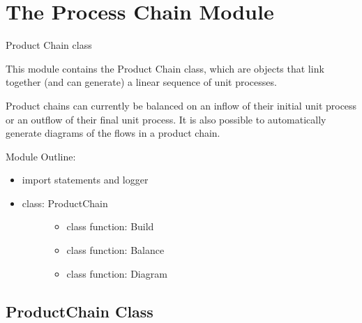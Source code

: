 \documentclass[a4paper,10pt,english]{sphinxmanual}
\begin{document}
\section{The Process Chain Module}
\label{\detokenize{chain:module-processchain}}\label{\detokenize{chain:the-process-chain-module}}\label{\detokenize{chain::doc}}
Product Chain class

This module contains the Product Chain class, which are objects that
link together (and can generate) a linear sequence of unit processes.

Product chains can currently be balanced on an inflow of their initial
unit process or an outflow of their final unit process. It is also possible
to automatically generate diagrams of the flows in a product chain.

Module Outline:
\begin{itemize}
\item {} 
import statements and logger

\item {} \begin{description}
\item[{class: ProductChain}] \leavevmode\begin{itemize}
\item {} 
class function: Build

\item {} 
class function: Balance

\item {} 
class function: Diagram

\end{itemize}

\end{description}

\end{itemize}


\subsection{ProductChain Class}
\label{\detokenize{chain:productchain-class}}
\end{document}
